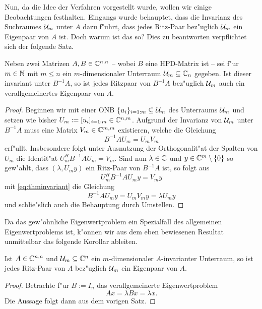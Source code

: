 Nun, da die Idee der Verfahren vorgestellt wurde, wollen wir einige Beobachtungen
festhalten. Eingangs wurde behauptet, dass die Invarianz des Suchraumes $\mathcal{U}_m$ unter
$A$ dazu f"uhrt, dass jedes Ritz-Paar bez"uglich $\mathcal{U}_m$ ein Eigenpaar von $A$ ist.
Doch warum ist das so? Dies zu beantworten verpflichtet sich der folgende Satz.

\begin{thm}\label{thm:invariant}
Neben zwei Matrizen $A,B\in\mathbb{C}^{n,n}$ -- wobei $B$ eine HPD-Matrix ist -- sei f"ur
$m\in\mathbb{N}$ mit $m\le n$ ein $m$-dimensionaler Unterraum $\mathcal{U}_m \subseteq \mathbb{C}_n$ gegeben.
Ist dieser invariant unter $B^{-1}A$, so ist jedes Ritzpaar von $B^{-1}A$
bez"uglich $\mathcal{U}_m$ auch ein verallgemeinertes Eigenpaar von $A$.
\end{thm}

\begin{proof}
Beginnen wir mit einer ONB $\{u_i\}_{i=1:m}\subseteq\mathcal{U}_m$ des Unterraums $\mathcal{U}_m$
und setzen wie bisher $U_m := [u_i]_{i=1:m}\in\mathbb{C}^{n,m}$. Aufgrund der Invarianz
von $\mathcal{U}_m$ unter $B^{-1}A$ muss eine Matrix $V_m \in \mathbb{C}^{m,m}$ existieren, welche
die Gleichung
\begin{equation}\label{eq:thminvariant}
B^{-1}A U_m = U_m V_m
\end{equation}
erf"ullt. Insbesondere folgt unter Ausnutzung der Orthogonalit"at der Spalten
von $U_m$ die Identit"at $U_m^H B^{-1}A U_m = V_m$.
Sind nun $\lambda\in\mathbb{C}$ und $y\in\mathbb{C}^m\setminus\{0\}$ so gew"ahlt, dass $(\lambda, U_m y)$
ein Ritz-Paar von $B^{-1}A$ ist, so folgt aus
\[
U_m^H B^{-1}A U_m y = V_m y
\]
mit \eqref{eq:thminvariant} die Gleichung
\[
B^{-1}AU_m y = U_m V_m y = \lambda U_m y
\]
und schlie"slich auch die Behauptung durch Umstellen.
\end{proof}

Da das gew"ohnliche Eigenwertproblem ein Spezialfall des allgemeinen Eigenwertproblems
ist, k"onnen wir aus dem eben bewiesenen Resultat unmittelbar das folgende Korollar
ableiten.

\begin{kor}
Ist $A\in\mathbb{C}^{n,n}$ und $\mathcal{U}_m\subseteq \mathbb{C}^n$ ein $m$-dimensionaler $A$-invarianter Unterraum, so ist
jedes Ritz-Paar von $A$ bez"uglich $\mathcal{U}_m$ ein Eigenpaar von $A$.
\end{kor}

\begin{proof}
Betrachte f"ur $B:=I_n$ das verallgemeinerte Eigenwertproblem
\[
Ax = \lambda Bx = \lambda x.
\]
Die Aussage folgt dann aus dem vorigen Satz.
\end{proof}

